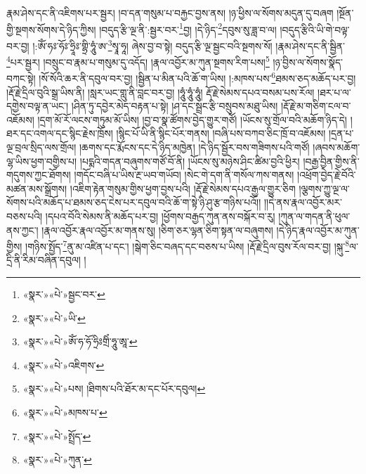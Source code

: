 རྣམ་ཤེས་དང་ནི་འཇིགས་པར་སྦྱར། །བ་དན་གསུམ་པ་བརྐྱང་བྱས་ནས། །ཉ་ཕྱིས་ལ་སོགས་མདུན་དུ་བཞག །སྔོན་གྱི་སྔགས་སོགས་དེ་ཉིད་ཀྱིས། །བདུད་རྩི་ལྔ་ནི་:སྦྱར་བར་\footnote{«སྣར་»«པེ་»སྦྱང་བར་}བྱ། །དེ་ཉིད་\footnote{«སྣར་»«པེ་»ཡི་}དབུས་སུ་ཟླ་བ་ལ། །བདུད་རྩིའི་ཡི་གེ་བལྟ་བར་བྱ། །:ཨོཾ་ཧཿ་ཧོཿ་ཧྲཱིཿ་གྷྲི་ཧཱུཾ་ཨ་\footnote{«སྣར་»«པེ་»ཨོཾ་ཧ་ཧོ་ཧྲིཿགྲིཾ་ཧཱུ་ཨཱ་}སྭཱ་ཧཱ། ཞེས་བྱ་བ་སྟེ། བདུད་རྩི་ལྔ་སྦྱང་བའི་སྔགས་སོ། །རྣམ་ཤེས་དང་ནི་སྦྱིན་\footnote{«སྣར་»«པེ་»འཇིགས་}པར་སྦྱར། །བསྲུང་བ་རྣམ་པ་གསུམ་དུ་འདོད། །རྣལ་འབྱོར་མ་ཀུན་སྔགས་རིག་པས།\footnote{«སྣར་»«པེ་»པས། །ཐིགས་པའི་ཐོར་མ་དང་པོར་དབུལ།} །ཉ་བྱིས་ལ་སོགས་སྣོད་བཀང་སྟེ། །སོ་སོའི་ཆར་ནི་དབུལ་བར་བྱ། །སྦྱིན་པ་མིན་པའི་ཆོ་ག་ཡིས། །:མཁས་པས་\footnote{«སྣར་»«པེ་»མཁས་པ་}ཐམས་ཅད་མཆོད་པར་བྱ། །རྡོ་རྗེ་དྲིལ་བུའི་སྒྲ་ཡིས་ནི། །སླར་ཡང་གླུ་ནི་བླང་བར་བྱ། །ཧཱུཾ་ཧཱུཾ་ཧཱུཾ། རྡོ་རྗེ་སེམས་དཔའ་བསམ་པས་རོལ། །ཐར་པ་ལ་དགྱེས་བལྟ་ན་ཡང་། །ཤིན་ཏུ་དབྱེར་མེད་བརྟན་པ་སྟེ། །ཤ་དང་སྦྲང་རྩི་བསྲུབས་མཐུ་ཡིས། །རྡོ་རྗེ་མ་གཅིག་ངལ་བ་འཇོམས། །དྲག་མོ་རོ་ལངས་གཏུམ་མོ་ཡིས། །བྱ་བ་སྣ་ཚོགས་བྱེད་གྱུར་གཙོ། །ཡོངས་སུ་གྲོལ་བའི་མཆོག་ཉིད་དེ། །ཐར་དང་འགལ་དང་སྙིང་རྗེས་ཁྲོས། །སྙིང་པོ་ཡི་ནི་སྙིང་པོར་གནས། །བཞི་པས་བཀབ་ཅིང་ཁྲོ་བ་འཇོམས། །དྲན་པ་ལྔ་བྲལ་སྲིད་ལས་གྲོལ། །ཆགས་དང་རྨོངས་དང་དེ་ཉིད་མཁྱེན། །དེ་ཉིད་སྦྱོར་བས་གཟིགས་པའི་གཙོ། །ཞབས་མཆོག་ལྷ་ཡིས་ཕྱག་བགྱིས་པ། །པདྨའི་གདན་བཞུགས་གཙོ་བོ་ནི། །ཡོངས་སུ་མཉེས་ཤིང་ཚིམ་བྱའི་ཕྱིར། །བརྒྱ་བྱིན་གྱིས་ནི་གདུགས་ཀྱང་ཐོགས། །གདོང་བཞི་པ་ཡིས་རྔ་ཡབ་གཡོབ། །སེང་གེ་དག་ནི་གསོལ་ཀས་གནས། །འཕྲོག་བྱེད་རྗེ་བོའི་མཚན་མས་སྒྲོགས། །འཇིག་རྟེན་གསུམ་གྱིས་ཕྱག་བྱས་པའི། །རྡོ་རྗེ་སེམས་དཔའ་རྒྱལ་གྱུར་ཅིག །ལྕགས་ཀྱུ་ལྔ་ལ་སོགས་པའི་མཆོད་པ་ཐམས་ཅད་ངེས་པར་དབུལ་བའི་ཆོ་ག་སྟེ་ཉི་ཤུ་རྩ་གཉིས་པའོ།། །།དེ་ནས་རྣལ་འབྱོར་མར་བཅས་པའི། །དཔའ་བོའི་སེམས་ནི་མཆོད་པར་བྱ། །ཕྱོགས་བརྒྱད་ཀུན་ནས་བསྐོར་བ་རུ། །ཀུན་ལ་གདན་ནི་ཕུལ་ནས་ཀྱང་། །རྣལ་འབྱོར་རྣལ་འབྱོར་མ་གནས་སུ། །ཅིག་ཅར་ལྷན་ཅིག་སྟན་ལ་བཞུགས། །དེ་ཉིད་རྣལ་འབྱོར་མ་ཀུན་གྱིས། །གཉིས་སྤྱོད་\footnote{«སྣར་»«པེ་»སྤྲོད་}ནུ་མ་འཛིན་པ་དང་། །སྒེག་ཅིང་བཞད་དང་བཅས་པ་ཡིས། །རྡོ་རྗེ་དྲིལ་བུས་རོལ་བར་བྱ། །སྐུ་\footnote{«སྣར་»«པེ་»ཀུན་}ལ་དྲི་ནི་རིམ་བཞིན་དབུལ། །
